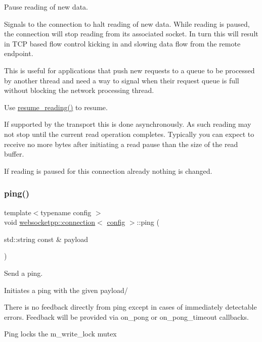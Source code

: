 Pause reading of new data. 

Signals to the connection to halt reading of new data. While reading is paused, the connection will stop reading from its associated socket. In turn this will result in T\+CP based flow control kicking in and slowing data flow from the remote endpoint.

This is useful for applications that push new requests to a queue to be processed by another thread and need a way to signal when their request queue is full without blocking the network processing thread.

Use {\ttfamily \mbox{\hyperlink{classwebsocketpp_1_1connection_a355b5e155ba53071b06fa8a6dfab9be2}{resume\+\_\+reading()}}} to resume.

If supported by the transport this is done asynchronously. As such reading may not stop until the current read operation completes. Typically you can expect to receive no more bytes after initiating a read pause than the size of the read buffer.

If reading is paused for this connection already nothing is changed. \mbox{\label{classwebsocketpp_1_1connection_a21c8dc6badfaff3aaee1434625c09b04}} 
\subsubsection{\texorpdfstring{ping()}{ping()}}
{\footnotesize\ttfamily template$<$typename config $>$ \\
void \mbox{\hyperlink{classwebsocketpp_1_1connection}{websocketpp\+::connection}}$<$ \mbox{\hyperlink{classconfig}{config}} $>$\+::ping (\begin{DoxyParamCaption}\item[{std\+::string const \&}]{payload }\end{DoxyParamCaption})}



Send a ping. 

Initiates a ping with the given payload/

There is no feedback directly from ping except in cases of immediately detectable errors. Feedback will be provided via on\+\_\+pong or on\+\_\+pong\+\_\+timeout callbacks.

Ping locks the m\+\_\+write\+\_\+lock mutex


